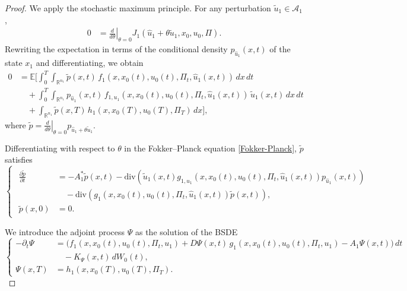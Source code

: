\documentclass[12pt]{article}
\theoremstyle{definition}
\begin{document}
\begin{proof}
We apply the stochastic maximum principle. For any perturbation \(\tilde{u}_1 \in \mathcal{A}_1\),
\begin{equation}
\label{Condicion optimalidad}
    \begin{aligned}
    0 &= \left.\frac{d}{d\theta}\right|_{\theta=0} J_1(\hat{u}_1+\theta\tilde{u}_1,x_0,u_0,\Pi).
    \end{aligned}
\end{equation}
Rewriting the expectation in terms of the conditional density $p_{\hat{u}_1}(x,t)$ of the state $x_1$ and differentiating, we obtain
\begin{align*}
0 &= \mathbb{E}\Bigg[\int_0^T\int_{\mathbb{R}^{n_1}} \tilde{p}(x,t)\, f_1(x,x_0(t),u_0(t),\Pi_t,\hat{u}_1(x,t)) \, dx\,dt \\
&\quad + \int_0^T\int_{\mathbb{R}^{n_1}} p_{\hat{u}_1}(x,t)\, f_{1,u_1}(x,x_0(t),u_0(t),\Pi_t,\hat{u}_1(x,t)) \, \tilde{u}_1(x,t)\, dx\,dt \\
&\quad + \int_{\mathbb{R}^{n_1}} \tilde{p}(x,T)\, h_1(x,x_0(T),u_0(T),\Pi_T)\, dx \Bigg],
\end{align*}
where \(\tilde{p}=\left.\tfrac{d}{d\theta}\right|_{\theta=0} p_{\hat{u}_1+\theta\tilde{u}_1}\).

Differentiating with respect to $\theta$ in the Fokker--Planck equation \eqref{Fokker-Planck}, $\tilde{p}$ satisfies
    \begin{equation*}
        \begin{cases}
            \begin{aligned}
                \frac{\partial \tilde{p}}{\partial t} &= -A_1^*\tilde{p}(x,t)-\mathrm{div}\left(\tilde{u}_1(x,t)g_{1,u_1}\left(x,x_0(t),u_0(t),\Pi_t,\hat{u}_1(x,t)\right)p_{\hat{u}_1}(x,t)\right)\\
                &\quad - \mathrm{div}\left(g_1\left(x,x_0(t),u_0(t),\Pi_t,\hat{u}_1(x,t)\right)\tilde{p}(x,t)\right),\\
                \tilde{p}(x,0) &= 0.
            \end{aligned}
        \end{cases}
    \end{equation*}

We introduce the adjoint process $\Psi$ as the solution of the BSDE
    \[
        \left\{
        \begin{aligned}
            -\partial_t \Psi &= \Big( f_1(x, x_0(t), u_0(t), \Pi_t, u_1) +  D\Psi(x,t)\, g_1(x,x_0(t),u_0(t),\Pi_t,u_1) - A_1 \Psi(x,t) \Big)\, dt \\
            &\quad - K_\Psi(x,t)\, dW_0(t), \\
            \Psi(x,T) &= h_1 \left( x, x_0(T), u_0(T), \Pi_T \right).
        \end{aligned}
        \right.
    \]


\end{proof}
\end{document}
